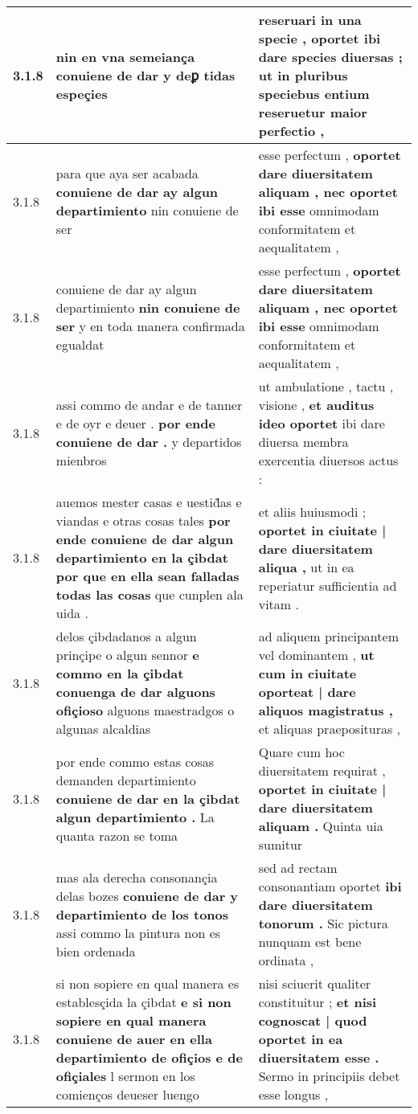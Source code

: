 \begin{tabular}{|p{1cm}|p{6.5cm}|p{6.5cm}|}
3.1.8 & nin en vna semeiança \textbf{ conuiene de dar } y deꝑ tidas espeçies & reseruari in una specie , \textbf{ oportet ibi dare species diuersas ; } ut in pluribus speciebus entium reseruetur maior perfectio , \\\hline
3.1.8 & para que aya ser acabada \textbf{ conuiene de dar ay algun departimiento } nin conuiene de ser & esse perfectum , \textbf{ oportet dare diuersitatem aliquam , nec oportet ibi esse } omnimodam conformitatem et aequalitatem , \\\hline
3.1.8 & conuiene de dar ay algun departimiento \textbf{ nin conuiene de ser } y en toda manera confirmada egualdat & esse perfectum , \textbf{ oportet dare diuersitatem aliquam , nec oportet ibi esse } omnimodam conformitatem et aequalitatem , \\\hline
3.1.8 & assi commo de andar e de tanner e de oyr e deuer . \textbf{ por ende conuiene de dar . } y departidos mienbros & ut ambulatione , tactu , visione , \textbf{ et auditus ideo oportet } ibi dare diuersa membra exercentia diuersos actus : \\\hline
3.1.8 & auemos mester casas e uestid̃as e viandas e otras cosas tales \textbf{ por ende conuiene de dar algun departimiento en la çibdat por que en ella sean falladas todas las cosas } que cunplen ala uida . & et aliis huiusmodi ; \textbf{ oportet in ciuitate | dare diuersitatem aliqua , } ut in ea reperiatur sufficientia ad vitam . \\\hline
3.1.8 & delos çibdadanos a algun prinçipe o algun sennor \textbf{ e commo en la çibdat conuenga de dar alguons ofiçioso } alguons maestradgos o algunas alcaldias & ad aliquem principantem vel dominantem , \textbf{ ut cum in ciuitate oporteat | dare aliquos magistratus , } et aliquas praeposituras , \\\hline
3.1.8 & por ende commo estas cosas demanden departimiento \textbf{ conuiene de dar en la çibdat algun departimiento . } La quanta razon se toma & Quare cum hoc diuersitatem requirat , \textbf{ oportet in ciuitate | dare diuersitatem aliquam . } Quinta uia sumitur \\\hline
3.1.8 & mas ala derecha consonançia delas bozes \textbf{ conuiene de dar y departimiento de los tonos } assi commo la pintura non es bien ordenada & sed ad rectam consonantiam oportet \textbf{ ibi dare diuersitatem tonorum . } Sic pictura nunquam est bene ordinata , \\\hline
3.1.8 & si non sopiere en qual manera es establesçida la çibdat \textbf{ e si non sopiere en qual manera conuiene de auer en ella departimiento de ofiçios e de ofiçiales } l sermon en los comienços deueser luengo & nisi sciuerit qualiter constituitur ; \textbf{ et nisi cognoscat | quod oportet in ea diuersitatem esse . } Sermo in principiis debet esse longus , \\\hline

\end{tabular}
